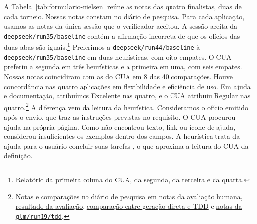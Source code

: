 \documentclass[a4paper,12pt,twoside,english,brazilian]{book}
\begin{document}
A Tabela~\ref{tab:formulario-nielsen} reúne as notas das quatro finalistas, duas de cada torneio. Nossas notas
constam no diário de pesquisa.
Para cada aplicação, usamos as notas da única
sessão que o verificador aceitou. A sessão aceita da
\texttt{deepseek/run35/baseline} contém a afirmação incorreta de que os
ofícios das duas abas são iguais.\footnote{\href{https://github.com/Educg550/tcc/blob/ee6d001c1f618419c6184644d18aa97bb33bcf9a/demos/runs/batch/deepseek/run44/baseline/_harness/cua-nielsen-opus55-20261011T174407Z/relatorio.md}{Relatório da primeira coluna do CUA},
\href{https://github.com/Educg550/tcc/blob/ee6d001c1f618419c6184644d18aa97bb33bcf9a/demos/runs/batch/deepseek/run35/baseline/_harness/cua-nielsen-opus55-20261013T193004Z/relatorio.md}{da segunda},
\href{https://github.com/Educg550/tcc/blob/ee6d001c1f618419c6184644d18aa97bb33bcf9a/demos/runs/batch/glm/run38/tdd/_harness/cua-nielsen-opus55-20261013T181944Z/relatorio.md}{da terceira}
e \href{https://github.com/Educg550/tcc/blob/ee6d001c1f618419c6184644d18aa97bb33bcf9a/demos/runs/batch/glm/run19/tdd/_harness/cua-nielsen-opus55-20261013T192131Z/relatorio.md}{da quarta}.}
Preferimos a \texttt{deepseek/run44/baseline} à
\texttt{deepseek/run35/baseline} em duas heurísticas, com oito empates.
O CUA preferiu a segunda em três heurísticas e a primeira em uma, com
seis empates. Nossas notas coincidiram com as do CUA em 8 das 40 comparações.
Houve concordância nas quatro aplicações em flexibilidade e eficiência de
uso. Em ajuda e documentação, atribuímos Excelente nas quatro, e o CUA
atribuiu Regular nas quatro.\footnote{Notas e
comparações no diário de pesquisa em \href{https://github.com/Educg550/tcc/blob/ee6d001c1f618419c6184644d18aa97bb33bcf9a/blog/2026-10-06-resultados-nielsen/index.md}{notas da avaliação humana},
\href{https://github.com/Educg550/tcc/blob/ee6d001c1f618419c6184644d18aa97bb33bcf9a/blog/2026-10-13-veredito/index.md}{resultado da avaliação},
\href{https://github.com/Educg550/tcc/blob/ee6d001c1f618419c6184644d18aa97bb33bcf9a/blog/2026-10-14-nielsen-baseline-vs-tdd.md}{comparação entre geração direta e TDD}
e \href{https://github.com/Educg550/tcc/blob/766d2ed6bcdbd8b89507e23582137cffe8c521f2/blog/2026-10-13-resultados-nielsen-tdd.md}{notas da \texttt{glm/run19/tdd}}.}
A diferença vem da leitura da heurística. Consideramos o ofício emitido após
o envio, que traz as instruções previstas no requisito. O CUA procurou ajuda
na própria página. Como não encontrou texto, link ou ícone de ajuda,
considerou insuficientes os exemplos dentro dos campos. A heurística trata
da ajuda para o usuário concluir suas tarefas \citep{nielsenHeuristicas},
o que aproxima a leitura do CUA da definição.
\end{document}
